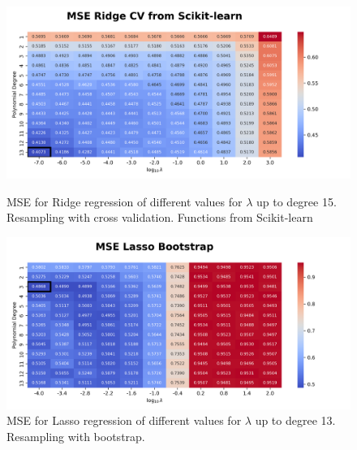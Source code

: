 \documentclass{article}
\begin{document}
\begin{figure}[htbp]
    \centering
    \includegraphics[width=\textwidth]{Project1/figures/Terrain/Heatmap_MSE_Ridge_CV_from_Scikit-learn.png}
    \label{fig:TerrainRidgeCVsklearn}
    \caption{MSE for Ridge regression of different values for $\lambda$ up to degree 15. Resampling with cross validation. Functions from Scikit-learn}
\end{figure}

\begin{figure}[htbp]
    \centering
    \includegraphics[width=\textwidth]{Project1/figures/Terrain/Heatmap_MSE_Lasso_Bootstrap.png}
    \caption{MSE for Lasso regression of different values for $\lambda$ up to degree 13. Resampling with bootstrap.}
    \label{fig:TerrainLassoBootstrap}
\end{figure}

\newpage
\end{document}
